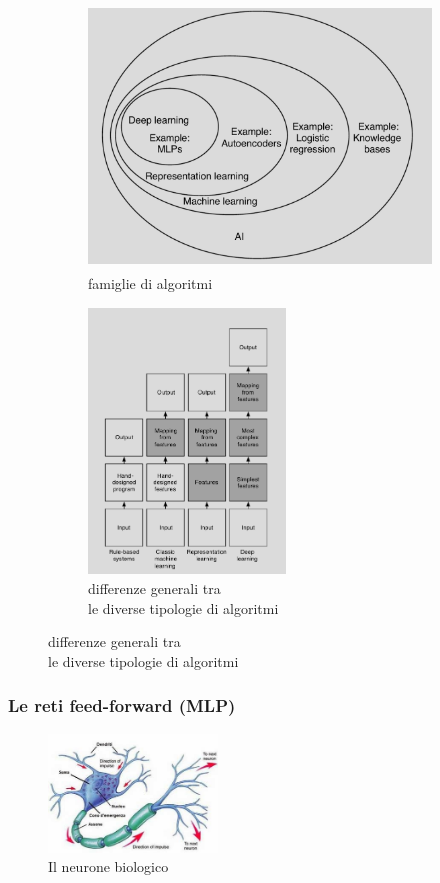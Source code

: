 \documentclass[10pt,a4paper]{article}
\begin{document}
\begin{figure}[h!]
  \centering
  \begin{subfigure}[t]{0.45\linewidth}
  	\centering
    \includegraphics[height=200pt]{AI_venn_diagram.png}
    \caption{famiglie di algoritmi}
  \end{subfigure}
  \begin{subfigure}[t]{0.45\linewidth}
  	\centering
    \includegraphics[height=200pt]{diff_between_aprochs.PNG}
    \caption{differenze generali tra \\ le diverse tipologie di algoritmi}
  \end{subfigure}
  \label{fig:graph1}
\end{figure}

\subsubsection{Le reti feed-forward (MLP)}

\begin{figure}
	\centering
	\vspace{-25pt}
    \includegraphics[width=0.4\textwidth]{neurone.jpg}
  	\caption{Il neurone biologico}
  	\label{fig:graph2}
  	\vspace{-20pt}
\end{figure}
\end{document}
